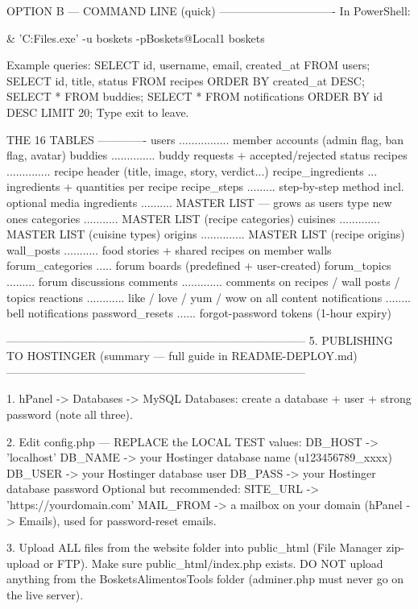 OPTION B — COMMAND LINE (quick)
-------------------------------
  In PowerShell:

    & 'C:\Program Files\bin\mariadb.exe' -u boskets -pBoskets@Local1 boskets

  Example queries:
    SELECT id, username, email, created_at FROM users;
    SELECT id, title, status FROM recipes ORDER BY created_at DESC;
    SELECT * FROM buddies;
    SELECT * FROM notifications ORDER BY id DESC LIMIT 20;
  Type  exit  to leave.

THE 16 TABLES
-------------
  users ................ member accounts (admin flag, ban flag, avatar)
  buddies .............. buddy requests + accepted/rejected status
  recipes .............. recipe header (title, image, story, verdict...)
  recipe_ingredients ... ingredients + quantities per recipe
  recipe_steps ......... step-by-step method incl. optional media
  ingredients .......... MASTER LIST — grows as users type new ones
  categories ........... MASTER LIST (recipe categories)
  cuisines ............. MASTER LIST (cuisine types)
  origins .............. MASTER LIST (recipe origins)
  wall_posts ........... food stories + shared recipes on member walls
  forum_categories ..... forum boards (predefined + user-created)
  forum_topics ......... forum discussions
  comments ............. comments on recipes / wall posts / topics
  reactions ............ like / love / yum / wow on all content
  notifications ........ bell notifications
  password_resets ...... forgot-password tokens (1-hour expiry)


--------------------------------------------------------------------------------
 5. PUBLISHING TO HOSTINGER (summary — full guide in README-DEPLOY.md)
--------------------------------------------------------------------------------

  1. hPanel -> Databases -> MySQL Databases:
     create a database + user + strong password (note all three).

  2. Edit config.php — REPLACE the LOCAL TEST values:
       DB_HOST  -> 'localhost'
       DB_NAME  -> your Hostinger database name  (u123456789_xxxx)
       DB_USER  -> your Hostinger database user
       DB_PASS  -> your Hostinger database password
     Optional but recommended:
       SITE_URL  -> 'https://yourdomain.com'
       MAIL_FROM -> a mailbox on your domain (hPanel -> Emails),
                    used for password-reset emails.

  3. Upload ALL files from the website folder into public_html
     (File Manager zip-upload or FTP). Make sure public_html/index.php exists.
     DO NOT upload anything from the BosketsAlimentosTools folder
     (adminer.php must never go on the live server).

